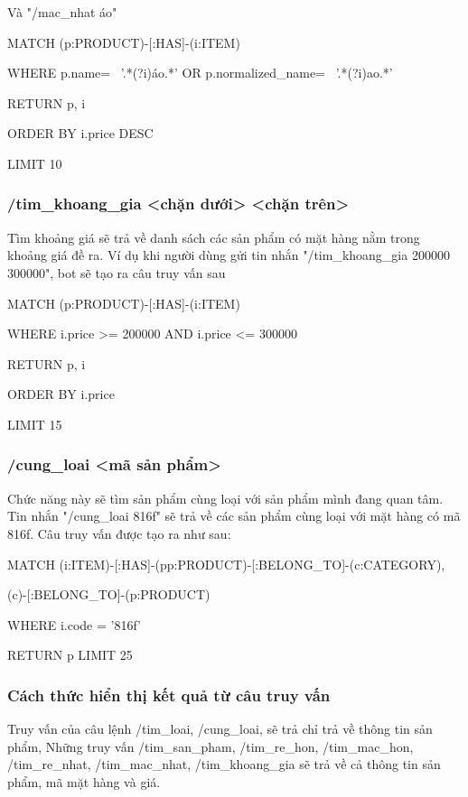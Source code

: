 \smallskip

Và "/mac\_nhat áo"

MATCH (p:PRODUCT)-[:HAS]-(i:ITEM)

WHERE p.name=~ '.*(?i)áo.*' OR p.normalized\_name=~ '.*(?i)ao.*' 

RETURN p, i 

ORDER BY i.price DESC 

LIMIT 10

\subsubsection{/tim\_khoang\_gia <chặn dưới> <chặn trên>}

Tìm khoảng giá sẽ trả về danh sách các sản phẩm có mặt hàng nằm trong khoảng giá đề ra. Ví dụ khi người dùng gửi tin nhắn "/tim\_khoang\_gia 200000 300000", bot sẽ tạo ra câu truy vấn sau 

MATCH (p:PRODUCT)-[:HAS]-(i:ITEM)  

WHERE i.price >= 200000 AND i.price <= 300000 

RETURN p, i 

ORDER BY i.price  

LIMIT 15

\subsubsection{/cung\_loai <mã sản phẩm>}

Chức năng này sẽ tìm sản phẩm cùng loại với sản phẩm mình đang quan tâm. Tin nhắn "/cung\_loai 816f" sẽ trả về các sản phẩm cùng loại với mặt hàng có mã 816f. Câu truy vấn được tạo ra như sau: 

MATCH (i:ITEM)-[:HAS]-(pp:PRODUCT)-[:BELONG\_TO]-(c:CATEGORY),

(c)-[:BELONG\_TO]-(p:PRODUCT)  

WHERE i.code = '816f'

RETURN p LIMIT 25



\subsubsection{Cách thức hiển thị kết quả từ câu truy vấn}

Truy vấn của câu lệnh /tim\_loai, /cung\_loai, sẽ trả chỉ trả về thông tin sản phẩm, Những truy vấn /tim\_san\_pham, /tim\_re\_hon, /tim\_mac\_hon, /tim\_re\_nhat, /tim\_mac\_nhat, /tim\_khoang\_gia sẽ trả về cả thông tin sản phẩm, mã mặt hàng và giá. 

